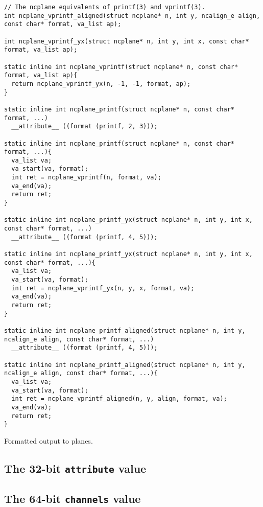 \begin{listing}[!htbp]
\begin{verbatim}
// The ncplane equivalents of printf(3) and vprintf(3).
int ncplane_vprintf_aligned(struct ncplane* n, int y, ncalign_e align, const char* format, va_list ap);

int ncplane_vprintf_yx(struct ncplane* n, int y, int x, const char* format, va_list ap);

static inline int ncplane_vprintf(struct ncplane* n, const char* format, va_list ap){
  return ncplane_vprintf_yx(n, -1, -1, format, ap);
}

static inline int ncplane_printf(struct ncplane* n, const char* format, ...)
  __attribute__ ((format (printf, 2, 3)));

static inline int ncplane_printf(struct ncplane* n, const char* format, ...){
  va_list va;
  va_start(va, format);
  int ret = ncplane_vprintf(n, format, va);
  va_end(va);
  return ret;
}

static inline int ncplane_printf_yx(struct ncplane* n, int y, int x, const char* format, ...)
  __attribute__ ((format (printf, 4, 5)));

static inline int ncplane_printf_yx(struct ncplane* n, int y, int x, const char* format, ...){
  va_list va;
  va_start(va, format);
  int ret = ncplane_vprintf_yx(n, y, x, format, va);
  va_end(va);
  return ret;
}

static inline int ncplane_printf_aligned(struct ncplane* n, int y, ncalign_e align, const char* format, ...)
  __attribute__ ((format (printf, 4, 5)));

static inline int ncplane_printf_aligned(struct ncplane* n, int y, ncalign_e align, const char* format, ...){
  va_list va;
  va_start(va, format);
  int ret = ncplane_vprintf_aligned(n, y, align, format, va);
  va_end(va);
  return ret;
}
\end{verbatim}
\caption{Formatted output to planes.}
\label{list:printf}
\end{listing}

\subsection{The 32-bit \texttt{attribute} value}
\label{sec:attribute}
\subsection{The 64-bit \texttt{channels} value}
\label{sec:channels}

